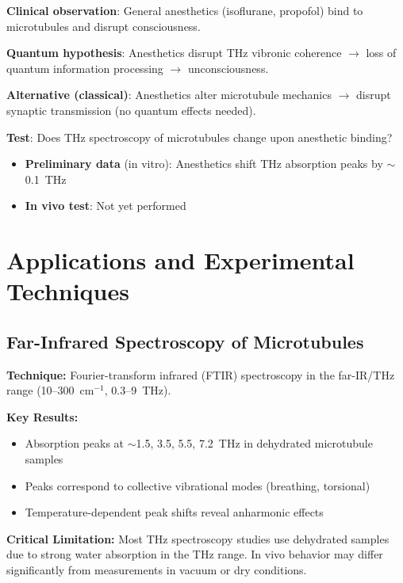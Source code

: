 \textbf{Clinical observation}: General anesthetics (isoflurane, propofol) bind to microtubules and disrupt consciousness.

\textbf{Quantum hypothesis}: Anesthetics disrupt THz vibronic coherence $\rightarrow$ loss of quantum information processing $\rightarrow$ unconsciousness.

\textbf{Alternative (classical)}: Anesthetics alter microtubule mechanics $\rightarrow$ disrupt synaptic transmission (no quantum effects needed).

\textbf{Test}: Does THz spectroscopy of microtubules change upon anesthetic binding?
\begin{itemize}
\item \textbf{Preliminary data} (in vitro): Anesthetics shift THz absorption peaks by $\sim$0.1~THz
\item \textbf{In vivo test}: Not yet performed
\end{itemize}




\section{Applications and Experimental Techniques}
\label{sec:applications}

\subsection{Far-Infrared Spectroscopy of Microtubules}
\label{subsec:app-ftir}

\textbf{Technique:} Fourier-transform infrared (FTIR) spectroscopy in the far-IR/THz range (10--300~cm$^{-1}$, 0.3--9~THz).

\textbf{Key Results:}
\begin{itemize}
\item Absorption peaks at $\sim$1.5, 3.5, 5.5, 7.2~THz in dehydrated microtubule samples
\item Peaks correspond to collective vibrational modes (breathing, torsional)
\item Temperature-dependent peak shifts reveal anharmonic effects
\end{itemize}

\begin{warningbox}
\textbf{Critical Limitation:} Most THz spectroscopy studies use dehydrated samples due to strong water absorption in the THz range. In vivo behavior may differ significantly from measurements in vacuum or dry conditions.
\end{warningbox}

